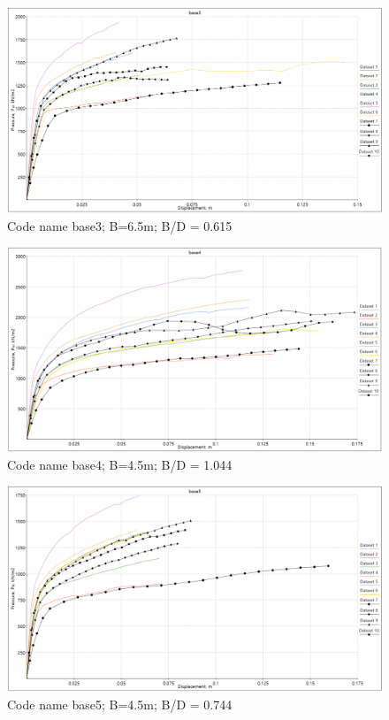 \documentclass[a4paper, nobind]{templates/ociamthesis}
\begin{document}
\begin{figure}[H]
\includegraphics[width=1\linewidth]{myfigureeeeee/BASE3} \caption{Code name base3; B=6.5m; B/D = 0.615}\label{fig:unnamed-chunk-38}
\end{figure}

\begin{figure}[H]
\includegraphics[width=1\linewidth]{myfigureeeeee/BASE4} \caption{Code name base4; B=4.5m; B/D = 1.044}\label{fig:unnamed-chunk-39}
\end{figure}

\begin{figure}[H]
\includegraphics[width=1\linewidth]{myfigureeeeee/BASE5} \caption{Code name base5; B=4.5m; B/D = 0.744}\label{fig:unnamed-chunk-40}
\end{figure}
\end{document}
